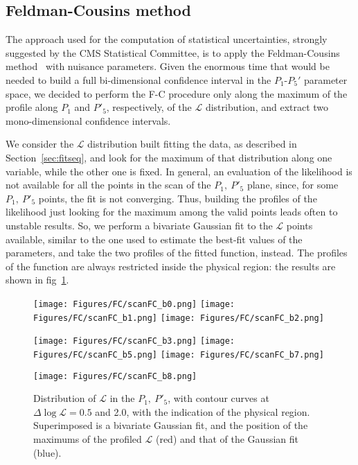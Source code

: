 

\subsection{Feldman-Cousins method}
The approach used for the computation of statistical uncertainties, strongly suggested by the CMS Statistical Committee, is to apply the Feldman-Cousins method~\cite{FC} with nuisance parameters.
Given the enormous time that would be needed to build a full bi-dimensional confidence interval in the $P_1$-$P_5'$ parameter space, we decided to perform the F-C procedure only along the maximum of the profile along $P_1$ and $P'_5$, respectively, of the $\mathcal{L}$ distribution, and extract two mono-dimensional confidence intervals.

We consider the $\mathcal{L}$ distribution built fitting the data, as described in Section~\ref{sec:fitseq}, and look for the maximum of that distribution along one variable, while the other one is fixed.
In general, an evaluation of the likelihood is not available for all the points in the scan of the $P_1,~P'_5$ plane, since, for some $P_1,~P'_5$ points, the fit is not converging.
Thus, building the profiles of the likelihood just looking for the maximum among the valid points leads often to unstable results.
So, we perform a bivariate Gaussian fit to the $\mathcal{L}$ points available, similar to the one used to estimate the best-fit values of the parameters, and take the two profiles of the fitted function, instead.
The profiles of the function are always restricted inside the physical region: the results are shown in fig~\ref{fig:profileL}.

\begin{figure}
  \centering
  \texttt{[image: Figures/FC/scanFC\_b0.png]}
  \texttt{[image: Figures/FC/scanFC\_b1.png]}
  \texttt{[image: Figures/FC/scanFC\_b2.png]}

  \texttt{[image: Figures/FC/scanFC\_b3.png]}
  \texttt{[image: Figures/FC/scanFC\_b5.png]}
  \texttt{[image: Figures/FC/scanFC\_b7.png]}

  \texttt{[image: Figures/FC/scanFC\_b8.png]}
  \caption{Distribution of $\mathcal{L}$ in the $P_1,~P'_5$, with contour curves at $\Delta\log{\mathcal{L}}=0.5$ and 2.0, with the indication of the physical region.
    Superimposed is a bivariate Gaussian fit, and the position of the maximums of the profiled $\mathcal{L}$ (red) and that of the Gaussian fit (blue).}
  \label{fig:profileL}
\end{figure}

